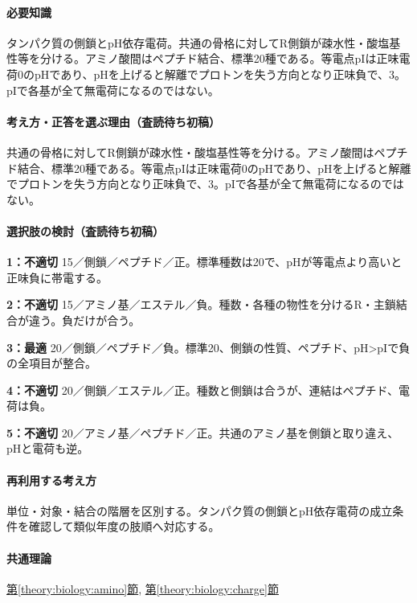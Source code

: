 \paragraph{必要知識} タンパク質の側鎖とpH依存電荷。共通の骨格に対してR側鎖が疎水性・酸塩基性等を分ける。アミノ酸間はペプチド結合、標準20種である。等電点pIは正味電荷0のpHであり、pHを上げると解離でプロトンを失う方向となり正味負で、3。pIで各基が全て無電荷になるのではない。

\paragraph{考え方・正答を選ぶ理由（査読待ち初稿）} 共通の骨格に対してR側鎖が疎水性・酸塩基性等を分ける。アミノ酸間はペプチド結合、標準20種である。等電点pIは正味電荷0のpHであり、pHを上げると解離でプロトンを失う方向となり正味負で、3。pIで各基が全て無電荷になるのではない。

\paragraph{選択肢の検討（査読待ち初稿）}\mbox{}\par

\noindent\textbf{1：不適切} 15／側鎖／ペプチド／正。標準種数は20で、pHが等電点より高いと正味負に帯電する。\par

\noindent\textbf{2：不適切} 15／アミノ基／エステル／負。種数・各種の物性を分けるR・主鎖結合が違う。負だけが合う。\par

\noindent\textbf{3：最適} 20／側鎖／ペプチド／負。標準20、側鎖の性質、ペプチド、pH>pIで負の全項目が整合。\par

\noindent\textbf{4：不適切} 20／側鎖／エステル／正。種数と側鎖は合うが、連結はペプチド、電荷は負。\par

\noindent\textbf{5：不適切} 20／アミノ基／ペプチド／正。共通のアミノ基を側鎖と取り違え、pHと電荷も逆。\par

\paragraph{再利用する考え方} 単位・対象・結合の階層を区別する。タンパク質の側鎖とpH依存電荷の成立条件を確認して類似年度の肢順へ対応する。

\paragraph{共通理論} \hyperref[theory:biology:amino]{第\ref*{theory:biology:amino}節}, \hyperref[theory:biology:charge]{第\ref*{theory:biology:charge}節}

